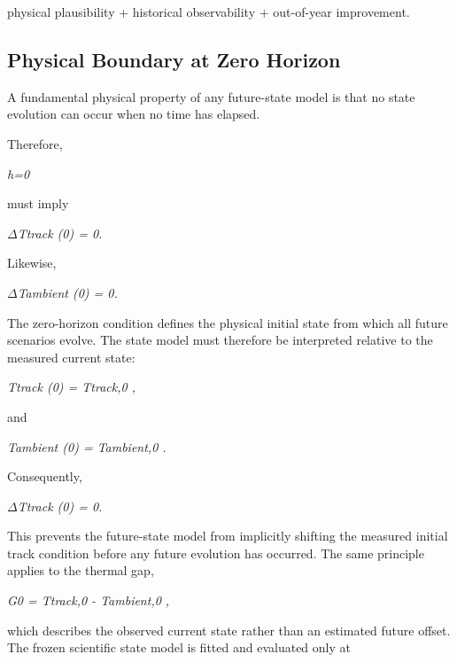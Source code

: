 physical plausibility + historical observability + out-of-year improvement.

\subsection{Physical Boundary at Zero Horizon}
A fundamental physical property of any future-state model is that no state evolution can occur when no time has elapsed.

Therefore,

\begin{center}\textit{h=0}\end{center}

must imply

\begin{center}\textit{\ensuremath{\Delta}Ttrack (0) = 0.}\end{center}

Likewise,

\begin{center}\textit{\ensuremath{\Delta}Tambient (0) = 0.}\end{center}

The zero-horizon condition defines the physical initial state from which all future scenarios evolve. The state model must therefore be interpreted relative to the measured current state:

\begin{center}\textit{Ttrack (0) = Ttrack,0 ,}\end{center}

and

\begin{center}\textit{Tambient (0) = Tambient,0 .}\end{center}

Consequently,

\begin{center}\textit{\ensuremath{\Delta}Ttrack (0) = 0.}\end{center}

This prevents the future-state model from implicitly shifting the measured initial track condition before any future evolution has occurred. The same principle applies to the thermal gap,

\begin{center}\textit{G0 = Ttrack,0 - Tambient,0 ,}\end{center}

which describes the observed current state rather than an estimated future offset. The frozen scientific state model is fitted and evaluated only at


